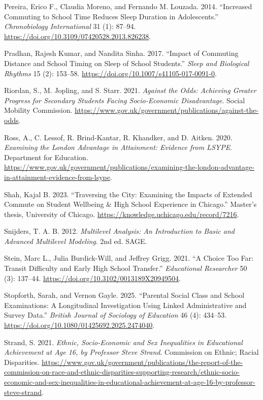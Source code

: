 \documentclass[
  12pt,
  titlepage]{article}
\newlength{\cslhangindent}
\newenvironment{CSLReferences}[2] %
 {\begin{list}{}{%
  \setlength{\itemindent}{0pt}
  \setlength{\leftmargin}{0pt}
  \setlength{\parsep}{0pt}
  \ifodd #1
   \setlength{\leftmargin}{\cslhangindent}
   \setlength{\itemindent}{-1\cslhangindent}
  \fi
  \setlength{\itemsep}{#2\baselineskip}}}
 {\end{list}}
\begin{document}
\begin{CSLReferences}{1}{1}
Pereira, Erico F., Claudia Moreno, and Fernando M. Louzada. 2014.
{``Increased Commuting to School Time Reduces Sleep Duration in
Adolescents.''} \emph{Chronobiology International} 31 (1): 87--94.
\url{https://doi.org/10.3109/07420528.2013.826238}.

Pradhan, Rajesh Kumar, and Nandita Sinha. 2017. {``Impact of Commuting
Distance and School Timing on Sleep of School Students.''} \emph{Sleep
and Biological Rhythms} 15 (2): 153--58.
\url{https://doi.org/10.1007/s41105-017-0091-0}.

Riordan, S., M. Jopling, and S. Starr. 2021. \emph{Against the Odds:
Achieving Greater Progress for Secondary Students Facing Socio-Economic
Disadvantage}. Social Mobility Commission.
\url{https://www.gov.uk/government/publications/against-the-odds}.

Ross, A., C. Lessof, R. Brind-Kantar, R. Khandker, and D. Aitken. 2020.
\emph{Examining the {London} Advantage in Attainment: Evidence from
{LSYPE}}. Department for Education.
\url{https://www.gov.uk/government/publications/examining-the-london-advantage-in-attainment-evidence-from-lsype}.

Shah, Kajal B. 2023. {``Traversing the {City}: {Examining} the {Impacts}
of {Extended} {Commute} on {Student} {Wellbeing} \& {High} {School}
{Experience} in {Chicago}.''} Master's thesis, University of Chicago.
\url{https://knowledge.uchicago.edu/record/7216}.

Snijders, T. A. B. 2012. \emph{Multilevel Analysis: An Introduction to
Basic and Advanced Multilevel Modeling}. 2nd ed. SAGE.

Stein, Marc L., Julia Burdick-Will, and Jeffrey Grigg. 2021. {``A Choice
Too Far: Transit Difficulty and Early High School Transfer.''}
\emph{Educational Researcher} 50 (3): 137--44.
\url{https://doi.org/10.3102/0013189X20949504}.

Stopforth, Sarah, and Vernon Gayle. 2025. {``Parental Social Class and
School Examinations: A Longitudinal Investigation Using Linked
Administrative and Survey Data.''} \emph{British Journal of Sociology of
Education} 46 (4): 434--53.
\url{https://doi.org/10.1080/01425692.2025.2474040}.

Strand, S. 2021. \emph{Ethnic, Socio-Economic and Sex Inequalities in
Educational Achievement at Age 16, by {Professor} {Steve} {Strand}}.
Commission on Ethnic; Racial Disparities.
\url{https://www.gov.uk/government/publications/the-report-of-the-commission-on-race-and-ethnic-disparities-supporting-research/ethnic-socio-economic-and-sex-inequalities-in-educational-achievement-at-age-16-by-professor-steve-strand}.


\end{CSLReferences}
\end{document}
